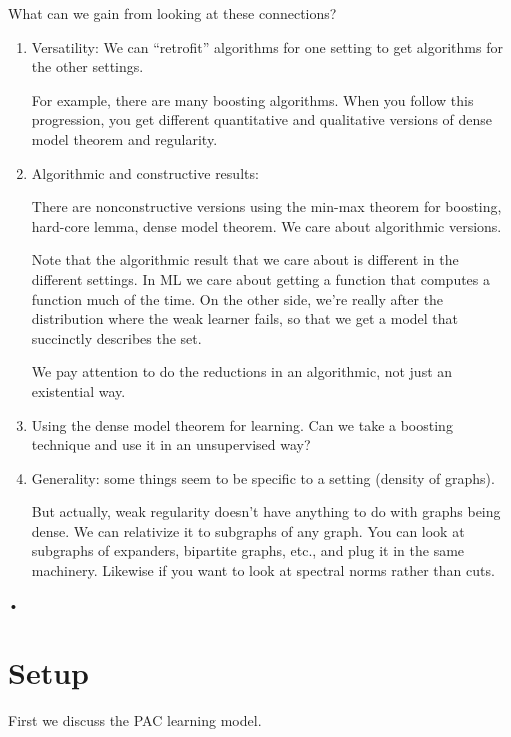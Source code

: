 What can we gain from looking at these connections?
\begin{enumerate}
\item
Versatility: We can ``retrofit'' algorithms for one setting to get algorithms for the other settings.

For example, there are many boosting algorithms. When you follow this progression, you get different quantitative and qualitative versions of dense model theorem and regularity.
\item
Algorithmic and constructive results: 

There are nonconstructive versions using the min-max theorem for boosting, hard-core lemma, dense model theorem. We care about algorithmic versions. 

Note that the algorithmic result that we care about is different in the different settings.  In ML we care about getting a function that computes a function much of the time. On the other side, we're really after the distribution where the weak learner fails, so that we get a model that succinctly describes the set. 

We pay attention to do the reductions in an algorithmic, not just an existential way.
\item
Using the dense model theorem for learning. Can we take a boosting technique and use it in an unsupervised way?
\item
Generality: some things seem to be specific to a setting (density of graphs). 

But actually, weak regularity doesn't have anything to do with graphs being dense. We can relativize it to subgraphs of any graph. You can look at subgraphs of expanders, bipartite graphs, etc., and plug it in the same machinery. Likewise if you want to look at spectral norms rather than cuts.
\end{enumerate}•


\section{Setup}
First we discuss the PAC learning model.

